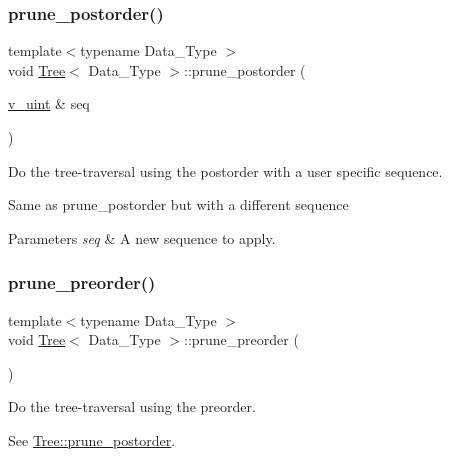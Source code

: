 \subsubsection{\texorpdfstring{prune\+\_\+postorder()}{prune\_postorder()}\hspace{0.1cm}{\footnotesize\ttfamily [2/2]}}
{\footnotesize\ttfamily template$<$typename Data\+\_\+\+Type $>$ \\
void \hyperlink{classpruner_1_1Tree}{Tree}$<$ Data\+\_\+\+Type $>$\+::prune\+\_\+postorder (\begin{DoxyParamCaption}\item[{\hyperlink{namespacepruner_af0145646bd7ede012cd336b416bc5579}{v\+\_\+uint} \&}]{seq }\end{DoxyParamCaption})\hspace{0.3cm}{\ttfamily [inline]}}



Do the tree-\/traversal using the postorder with a user specific sequence. 

Same as {\ttfamily prune\+\_\+postorder} but with a different sequence 
\begin{DoxyParams}{Parameters}
{\em seq} & A new sequence to apply. \\
\hline
\end{DoxyParams}
\mbox{\label{classpruner_1_1Tree_a960ac327488daa6b2de86ea7be5aee7d}} 
\subsubsection{\texorpdfstring{prune\+\_\+preorder()}{prune\_preorder()}\hspace{0.1cm}{\footnotesize\ttfamily [1/2]}}
{\footnotesize\ttfamily template$<$typename Data\+\_\+\+Type $>$ \\
void \hyperlink{classpruner_1_1Tree}{Tree}$<$ Data\+\_\+\+Type $>$\+::prune\+\_\+preorder (\begin{DoxyParamCaption}{ }\end{DoxyParamCaption})\hspace{0.3cm}{\ttfamily [inline]}}



Do the tree-\/traversal using the preorder. 

See \hyperlink{classpruner_1_1Tree_a7e50f34814e6f158cbff23dbe0312a8e}{Tree\+::prune\+\_\+postorder}. \mbox{\label{classpruner_1_1Tree_afb20a52559dd24b773a694dcbb76ef5c}} 
